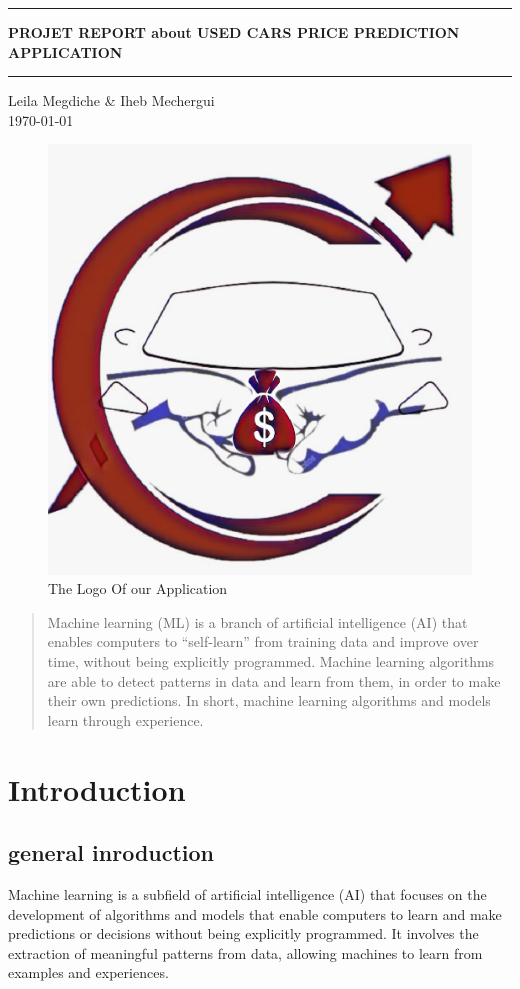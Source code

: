 \documentclass{article}
\begin{document}
\begin{center}
\hrule
\vspace*{1cm}
\Large \textbf {\LARGE PROJET REPORT about USED CARS PRICE PREDICTION APPLICATION}
\vspace*{1cm}
\hrule
\end{center}
\vspace*{2cm}
\begin{center}
  \large Leila Megdiche \& Iheb Mechergui \\
  \today
  \end{center}
  \vspace*{2cm}
\begin{figure}[H]
  \centering
  \includegraphics[width = 0.4 \linewidth]{Logo_App.jpeg}
  \caption{The Logo Of our Application} \label{exemple-ref-img}
\end{figure}
\vspace*{1cm}

\tableofcontents  %
\newpage
\listoffigures  %
\newpage

\begin{abstract}
    Machine learning (ML) is a branch of artificial intelligence (AI) that enables computers to “self-learn” from training data and improve over time, 
    without being explicitly programmed. Machine learning algorithms are able to detect patterns in data and learn from them, in order to make their own predictions. 
    In short, machine learning algorithms and models learn through experience.
  
  \end{abstract}


\section{Introduction}
\subsection{general inroduction }
Machine learning is a subfield of artificial intelligence (AI) that focuses on the development of algorithms and models that enable computers to learn and make predictions or decisions without being explicitly programmed. It involves the extraction of meaningful patterns from data, allowing machines to learn from examples and experiences.
\end{document}
